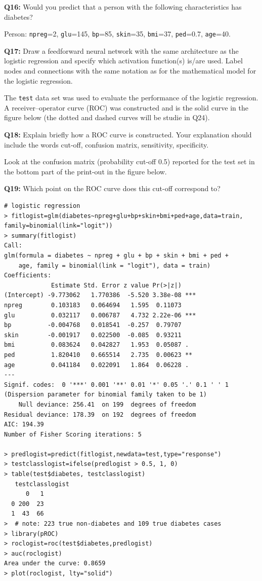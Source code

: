 \documentclass[]{article}
\begin{document}
\textbf{Q16:} Would you predict that a person with the following
characteristics has diabetes?

Person: \texttt{npreg}=2, \texttt{glu}=145, \texttt{bp}=85,
\texttt{skin}=35, \texttt{bmi}=37, \texttt{ped}=0.7, \texttt{age}=40.

\textbf{Q17:} Draw a feedforward neural network with the same
architecture as the logistic regression and specify which activation
function(s) is/are used. Label nodes and connections with the same
notation as for the mathematical model for the logistic regression.

The \texttt{test} data set was used to evaluate the performance of the
logistic regression. A receiver--operator curve (ROC) was constructed
and is the solid curve in the figure below (the dotted and dashed curves
will be studie in Q24).

\textbf{Q18:} Explain briefly how a ROC curve is constructed. Your
explanation should include the words cut-off, confusion matrix,
sensitivity, specificity.

Look at the confusion matrix (probability cut-off 0.5) reported for the
test set in the bottom part of the print-out in the figure below.

\textbf{Q19:} Which point on the ROC curve does this cut-off correspond
to?

\begin{verbatim}
# logistic regression
> fitlogist=glm(diabetes~npreg+glu+bp+skin+bmi+ped+age,data=train,
family=binomial(link="logit"))
> summary(fitlogist)
Call:
glm(formula = diabetes ~ npreg + glu + bp + skin + bmi + ped + 
    age, family = binomial(link = "logit"), data = train)
Coefficients:
             Estimate Std. Error z value Pr(>|z|)    
(Intercept) -9.773062   1.770386  -5.520 3.38e-08 ***
npreg        0.103183   0.064694   1.595  0.11073    
glu          0.032117   0.006787   4.732 2.22e-06 ***
bp          -0.004768   0.018541  -0.257  0.79707    
skin        -0.001917   0.022500  -0.085  0.93211    
bmi          0.083624   0.042827   1.953  0.05087 .  
ped          1.820410   0.665514   2.735  0.00623 ** 
age          0.041184   0.022091   1.864  0.06228 .  
---
Signif. codes:  0 '***' 0.001 '**' 0.01 '*' 0.05 '.' 0.1 ' ' 1
(Dispersion parameter for binomial family taken to be 1)
    Null deviance: 256.41  on 199  degrees of freedom
Residual deviance: 178.39  on 192  degrees of freedom
AIC: 194.39
Number of Fisher Scoring iterations: 5

> predlogist=predict(fitlogist,newdata=test,type="response")
> testclasslogist=ifelse(predlogist > 0.5, 1, 0)
> table(test$diabetes, testclasslogist)
   testclasslogist
      0   1
  0 200  23
  1  43  66
>  # note: 223 true non-diabetes and 109 true diabetes cases
> library(pROC)
> roclogist=roc(test$diabetes,predlogist)
> auc(roclogist)
Area under the curve: 0.8659
> plot(roclogist, lty="solid")
\end{verbatim}
\end{document}
